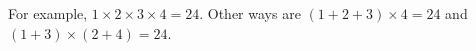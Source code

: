 For example, $\boxed{1\times2\times3\times4=24}$. Other ways are $(1+2+3)\times4=24$ and $(1+3)\times(2+4)=24$.
